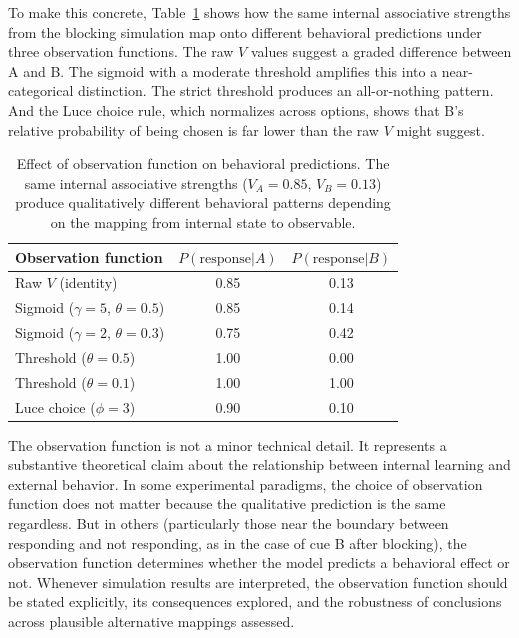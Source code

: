 \documentclass[fleqn,10pt]{wlscirep}
\begin{document}
\begin{linenumbers}
To make this concrete, Table~\ref{tab:obsfun} shows how the same internal associative strengths from the blocking simulation map onto different behavioral predictions under three observation functions. The raw $V$ values suggest a graded difference between A and B. The sigmoid with a moderate threshold amplifies this into a near-categorical distinction. The strict threshold produces an all-or-nothing pattern. And the Luce choice rule, which normalizes across options, shows that B's relative probability of being chosen is far lower than the raw $V$ might suggest.

\begin{table}[t]
\centering
\small
\caption{Effect of observation function on behavioral predictions. The same internal associative strengths ($V_A = 0.85$, $V_B = 0.13$) produce qualitatively different behavioral patterns depending on the mapping from internal state to observable.}
\label{tab:obsfun}
\begin{tabular}{lcc}
\toprule
\textbf{Observation function} & $P(\text{response}|A)$ & $P(\text{response}|B)$ \\
\midrule
Raw $V$ (identity) & 0.85 & 0.13 \\
Sigmoid ($\gamma=5$, $\theta=0.5$) & 0.85 & 0.14 \\
Sigmoid ($\gamma=2$, $\theta=0.3$) & 0.75 & 0.42 \\
Threshold ($\theta=0.5$) & 1.00 & 0.00 \\
Threshold ($\theta=0.1$) & 1.00 & 1.00 \\
Luce choice ($\phi=3$) & 0.90 & 0.10 \\
\bottomrule
\end{tabular}
\end{table}

The observation function is not a minor technical detail. It represents a substantive theoretical claim about the relationship between internal learning and external behavior. In some experimental paradigms, the choice of observation function does not matter because the qualitative prediction is the same regardless. But in others (particularly those near the boundary between responding and not responding, as in the case of cue B after blocking), the observation function determines whether the model predicts a behavioral effect or not. Whenever simulation results are interpreted, the observation function should be stated explicitly, its consequences explored, and the robustness of conclusions across plausible alternative mappings assessed.


\end{linenumbers}
\end{document}
